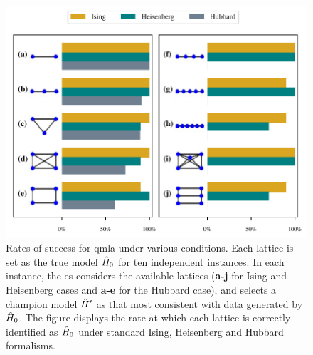 \begin{figure}
    \begin{center}
        \includegraphics{theoretical_study/figures/lattices/lattice_successes_two_column.pdf}
    \end{center}
    \caption[\gls{qmla} success rates for lattices]{
        Rates of success for \gls{qmla} under various conditions. 
        Each lattice is set as the \gls{true model} $\hat{H}_0$ for ten independent instances. 
        In each instance, the \gls{es} considers the available lattices 
            (\textbf{a-j} for Ising and Heisenberg cases and \textbf{a-e} for the Hubbard case), 
            and selects a \gls{champion model} $\hat{H}^{\prime}$ as that most consistent with data generated by $\hat{H}_0$. 
        The figure displays the rate at which each lattice is correctly identified as $\hat{H}_0$
            under standard Ising, Heisenberg and Hubbard formalisms. 
        \figtableref
    }
    \label{fig:lattice_success_rates}
\end{figure}    

